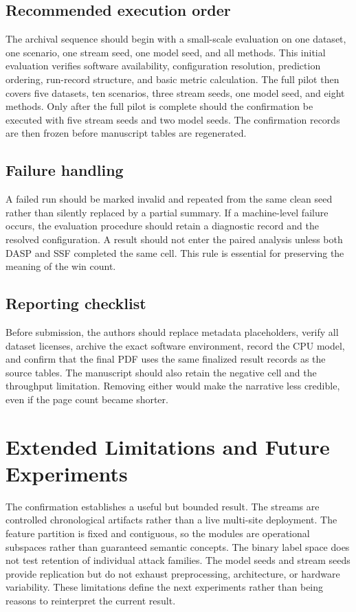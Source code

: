\subsection{Recommended execution order}
The archival sequence should begin with a small-scale evaluation on one dataset, one scenario, one stream seed, one model seed, and all methods. This initial evaluation verifies software availability, configuration resolution, prediction ordering, run-record structure, and basic metric calculation. The full pilot then covers five datasets, ten scenarios, three stream seeds, one model seed, and eight methods. Only after the full pilot is complete should the confirmation be executed with five stream seeds and two model seeds. The confirmation records are then frozen before manuscript tables are regenerated.

\subsection{Failure handling}
A failed run should be marked invalid and repeated from the same clean seed rather than silently replaced by a partial summary. If a machine-level failure occurs, the evaluation procedure should retain a diagnostic record and the resolved configuration. A result should not enter the paired analysis unless both DASP and SSF completed the same cell. This rule is essential for preserving the meaning of the win count.

\subsection{Reporting checklist}
Before submission, the authors should replace metadata placeholders, verify all dataset licenses, archive the exact software environment, record the CPU model, and confirm that the final PDF uses the same finalized result records as the source tables. The manuscript should also retain the negative cell and the throughput limitation. Removing either would make the narrative less credible, even if the page count became shorter.

\section{Extended Limitations and Future Experiments}
\label{app:future-work}

The confirmation establishes a useful but bounded result. The streams are controlled chronological artifacts rather than a live multi-site deployment. The feature partition is fixed and contiguous, so the modules are operational subspaces rather than guaranteed semantic concepts. The binary label space does not test retention of individual attack families. The model seeds and stream seeds provide replication but do not exhaust preprocessing, architecture, or hardware variability. These limitations define the next experiments rather than being reasons to reinterpret the current result.

